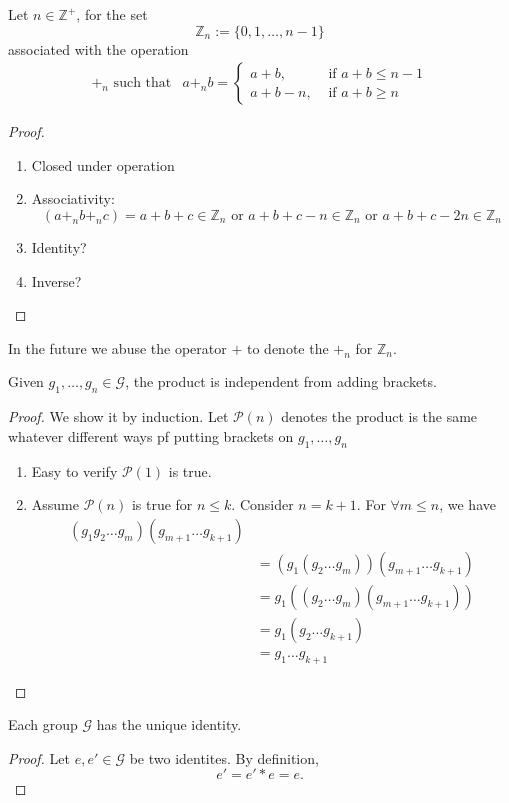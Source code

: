 \begin{proposition}
Let $n\in\mathbb{Z}^+$, for the set 
\[
\mathbb{Z}_n:=\{0,1,\dots,n-1\}
\]
associated with the operation
\[
\begin{array}{ll}
{+_n}\mbox{ such that}
&
a{+_n}b=\left\{
\begin{aligned}
a+b, &\mbox{ if $a+b\le n-1$}
\\
a+b -n , &\mbox{ if $a+b\ge n$}
\end{aligned}
\right.
\end{array}
\]
\end{proposition}
\begin{proof}
\begin{enumerate}
\item
Closed under operation
\item
Associativity: 
\[
(a+_n b+_n c) = a+b+c\in\mathbb{Z}_n\mbox{ or }a+b+c -n\in\mathbb{Z}_n\mbox{ or }a+b+c-2n\in\mathbb{Z}_n
\]
\item
Identity?
\item
Inverse?
\end{enumerate}
\end{proof}
In the future we abuse the operator $+$ to denote the $+_n$ for $\mathbb{Z}_n$.
\begin{theorem}
Given $g_1,\dots,g_n\in\mathcal{G}$, the product is independent from adding brackets.
\end{theorem}
\begin{proof}
We show it by induction. Let $\mathcal{P}(n)$ denotes the product is the same whatever different ways pf putting brackets on $g_1,\dots,g_n$
\begin{enumerate}
\item
Easy to verify $\mathcal{P}(1)$ is true.
\item
Assume $\mathcal{P}(n)$ is true for $n\le k$. Consider $n=k+1$. For $\forall m\le  n$, we have
\begin{align*}
(g_1g_2\dots g_m)(g_{m+1}\dots g_{k+1})&
\\
&=(g_1(g_2\dots g_m))(g_{m+1}\dots g_{k+1})\\
&=g_1((g_2\dots g_m)(g_{m+1}\dots g_{k+1}))\\
&=g_1(g_2\dots g_{k+1})\\
&=g_1\dots g_{k+1}
\end{align*}
\end{enumerate}
\end{proof}
\begin{theorem}
Each group $\mathcal{G}$ has the unique identity.
\end{theorem}
\begin{proof}
Let $e,e'\in\mathcal{G}$ be two identites. By definition,
\[
e' = e'* e = e.
\]
\end{proof}














